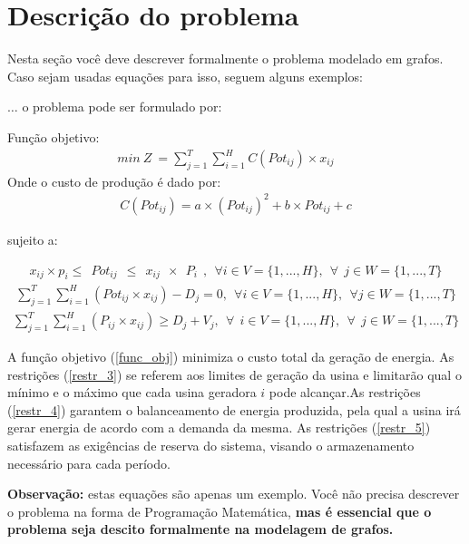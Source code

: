 \documentclass[12pt,fleqn]{article}
\begin{document}
\section{Descrição do problema}
\label{secProblema}
 
 Nesta seção você deve descrever formalmente o problema modelado em grafos. Caso sejam usadas equações para isso, seguem alguns exemplos:

$\dots$ o problema  pode ser formulado por:

Função objetivo:
\begin{eqnarray}
min ~Z ~= \sum_{j=1}^{T} \sum_{i=1}^{H} C(Pot_{ij})\times x_{ij}   & & \label{func_obj}
\end{eqnarray}
Onde o custo de produção é dado por:
\begin{eqnarray}
C(Pot_{ij}) = a\times (Pot_{ij})^2+b\times Pot_{ij}+c
\end{eqnarray}

sujeito a:

\begin{eqnarray}
x_{ij} \times p_{i}  \leq ~~Pot_{ij} ~~\leq ~~ x_{ij} ~~\times ~~P_{i} ~~,  ~~\forall  i \in V=\{1,...,H\},~~\forall ~~ j\in W=\{1,...,T\} \label{restr_3}
\end{eqnarray}
\begin{eqnarray}
\sum_{j=1}^{T} \sum_{i=1}^{H} (Pot_{ij}\times x_{ij}) - D_{j} = 0 , ~~ \forall  i\in V=\{1,...,H\},~~\forall  j\in W=\{1,...,T\}  \label{restr_4}
\end{eqnarray}
\begin{eqnarray}
\sum_{j=1}^{T} \sum_{i=1}^{H} (P_{ij}\times x_{ij}) \geq D_{j}+V_{j} ,  ~~\forall ~~ i\in V=\{1,...,H\},~~\forall ~~ j\in W=\{1,...,T\}  \label{restr_5}
\end{eqnarray}


A função objetivo (\ref{func_obj})   minimiza o custo total da geração de energia.  As restrições (\ref{restr_3}) se referem aos limites de geração da usina e limitarão qual o mínimo e o máximo que cada usina geradora $i$ pode alcançar.As restrições (\ref{restr_4}) garantem o balanceamento de energia produzida, pela qual a usina irá gerar energia de acordo com a demanda da mesma. As restrições (\ref{restr_5}) satisfazem as exigências de reserva do sistema, visando o armazenamento necessário para cada período. 

\textbf{Observação:} estas equações são apenas um exemplo. Você não precisa descrever o problema na forma de Programação Matemática, \textbf{mas é essencial que o problema seja descito formalmente na modelagem de grafos.}
\end{document}
